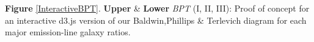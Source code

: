 \label{InteractiveBPT} \textbf{Figure} \ref{InteractiveBPT}. \textbf{Upper} & \textbf{Lower} \textit{BPT} (I, II, III): Proof of concept for an interactive d3.js version of our Baldwin,Phillips \& Terlevich diagram for each major emission-line galaxy ratios.
  
